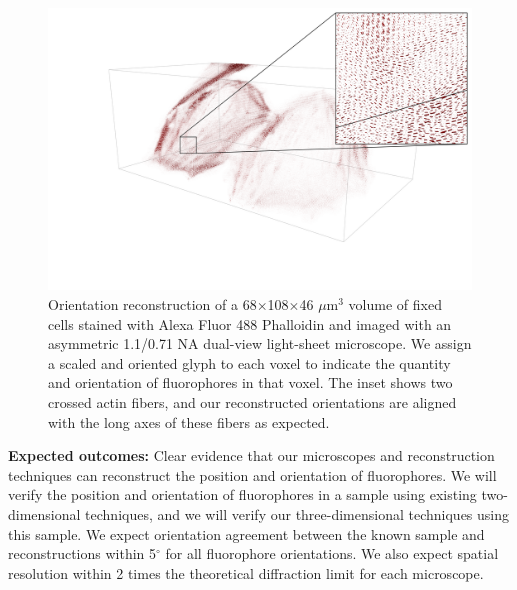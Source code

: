 \documentclass[11pt]{article}
\begin{document}
\begin{figure}[t]
  \begin{minipage}[c]{0.7\textwidth}
    \includegraphics[width=\textwidth, trim={3em 0em 0em 0em}]{figs/inset}
  \end{minipage}\hfill
  \begin{minipage}[c]{0.25\textwidth}
    \vspace{-1em}
    \caption{Orientation reconstruction of a 68$\times$108$\times$46 $\mu$m${}^3$
    volume of fixed cells stained with Alexa Fluor 488 Phalloidin and imaged
    with an asymmetric 1.1/0.71 NA dual-view light-sheet microscope. We assign a
    scaled and oriented glyph to each voxel to indicate the quantity and
    orientation of fluorophores in that voxel. The inset shows two crossed actin
    fibers, and our reconstructed orientations are aligned with the long axes of these
    fibers as expected.
    } \label{fig:recon}
  \end{minipage}
\vspace{-5em}  
\end{figure}

\noindent\textbf{Expected outcomes:} Clear evidence that our microscopes and
reconstruction techniques can reconstruct the position and orientation of
fluorophores. We will verify the position and orientation of fluorophores in a
sample using existing two-dimensional techniques, and we will verify our
three-dimensional techniques using this sample. We expect orientation agreement
between the known sample and reconstructions within 5$^{\circ}$ for all
fluorophore orientations. We also expect spatial resolution within 2 times the
theoretical diffraction limit for each microscope.
\end{document}
